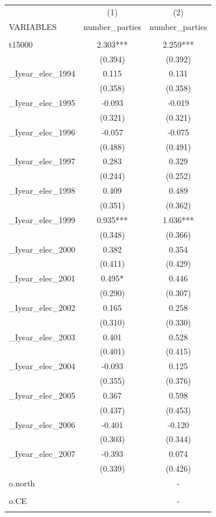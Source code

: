 \documentclass[]{article}
\begin{document}
\begin{tabular}{lcc} \hline
 & (1) & (2) \\
VARIABLES & number\_parties & number\_parties \\ \hline
 &  &  \\
t15000 & 2.303*** & 2.259*** \\
 & (0.394) & (0.392) \\
\_Iyear\_elec\_1994 & 0.115 & 0.131 \\
 & (0.358) & (0.358) \\
\_Iyear\_elec\_1995 & -0.093 & -0.019 \\
 & (0.321) & (0.321) \\
\_Iyear\_elec\_1996 & -0.057 & -0.075 \\
 & (0.488) & (0.491) \\
\_Iyear\_elec\_1997 & 0.283 & 0.329 \\
 & (0.244) & (0.252) \\
\_Iyear\_elec\_1998 & 0.409 & 0.489 \\
 & (0.351) & (0.362) \\
\_Iyear\_elec\_1999 & 0.935*** & 1.036*** \\
 & (0.348) & (0.366) \\
\_Iyear\_elec\_2000 & 0.382 & 0.354 \\
 & (0.411) & (0.429) \\
\_Iyear\_elec\_2001 & 0.495* & 0.446 \\
 & (0.290) & (0.307) \\
\_Iyear\_elec\_2002 & 0.165 & 0.258 \\
 & (0.310) & (0.330) \\
\_Iyear\_elec\_2003 & 0.401 & 0.528 \\
 & (0.401) & (0.415) \\
\_Iyear\_elec\_2004 & -0.093 & 0.125 \\
 & (0.355) & (0.376) \\
\_Iyear\_elec\_2005 & 0.367 & 0.598 \\
 & (0.437) & (0.453) \\
\_Iyear\_elec\_2006 & -0.401 & -0.120 \\
 & (0.303) & (0.344) \\
\_Iyear\_elec\_2007 & -0.393 & 0.074 \\
 & (0.339) & (0.426) \\
o.north &  & - \\
 &  &  \\
o.CE &  & - \\
 &  &  \\

\end{tabular}
\end{document}
